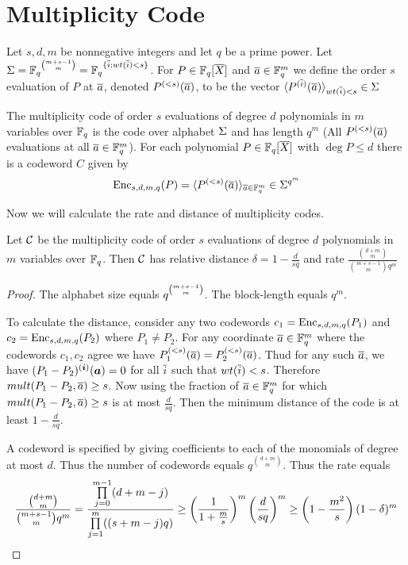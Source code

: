\section{Multiplicity Code}
\begin{definition}
	Let $s,d,m$ be nonnegative integers and let $q$ be a prime power. Let $\Sigma=\mathbb{F}_q\strut^{{m+s-1}\choose{m}}=\mathbb{F}_q\strut^{\{\overline{i}:wt(\overline{i})<s\}}$. For $P\in \mathbb{F}_q[\overline{X}]$ and $\overline{a}\in \mathbb{F}_q^m$ we define the order $s$ evaluation of $P$ at $\overline{a}$, denoted $P^{(<s)}(\overline{a})$, to be the vector $\langle P^{(\overline{i})}(\overline{a})\rangle_{wt(\overline{i})<s}\in \Sigma$
\end{definition}
\begin{definition}
	The multiplicity code of order $s$ evaluations of degree $d$ polynomials in $m$ variables over $\mathbb{F}_q$ is the code over alphabet $\Sigma$ and has length $q^m$ (All $P^{(<s)}(\overline{a})$ evaluations at all $\overline{a}\in \mathbb{F}_q^m$). For each polynomial $P\in \mathbb{F}_q[\overline{X}]$ with $\deg P\leq d$ there is a codeword $C$ given by $$\operatorname{Enc}_{s,d,m,q}(P)=\langle P^{(<s)}(\overline{a})\rangle_{\overline{a}\in \mathbb{F}_q^m}\in \Sigma^{q^m}$$
\end{definition}
Now we will calculate the rate and distance of multiplicity codes.
\begin{theorem}
	Let $\mathcal{C}$ be the multiplicity code of order $s$ evaluations of degree $d$ polynomials in $m$ variables over $\mathbb{F}_q$. Then $\mathcal{C}$ has relative distance $\delta=1-\frac{d}{sq}$ and rate $\frac{{{d+m}\choose{m}}}{{{m+s-1}\choose{m}}q^m}$
\end{theorem}
\begin{proof}
	The alphabet size equals $q\strut^{{m+s-1}\choose{m}}$. The block-length equals $q^m$.
	
	To calculate the distance, consider any two codewords $c_1=\operatorname{Enc}_{s,d,m,q}(P_1)$ and $c_2=\operatorname{Enc}_{s,d,m,q}(P_2)$ where $P_1\neq P_2$. For any coordinate $\overline{a} \in \mathbb{F}_q^m$ where the codewords $c_1,c_2$ agree we have $P_1^{(<s)}(\overline{a})=P_2^{(<s)}(\overline{a})$. Thud for any such $\overline{a} $, we have $(P_1-P_2)^{(\boldsymbol{i})}(\boldsymbol{a})=0$ for all $\overline{i}$ such that $wt(\overline{i})<s$. Therefore $mult(P_1-P_2,\overline{a})\geq s$. Now using  the fraction of $\overline{a}\in \mathbb{F}_q^m$ for which $mult(P_1-P_2,\overline{a})\geq s$ is at most $\frac{d}{sq}$. Then the minimum distance of the code is at least $1-\frac{d}{sq}$.
	
	A codeword is specified by giving coefficients to each of the monomials of degree at most $d$. Thus the number of codewords equals $q^{{{d+m}\choose{m}}}$. Thus the rate equals $$\frac{{{d+m}\choose{m}}}{{{m+s-1}\choose{m}}q^m}=\frac{\prod\limits_{j=0}^{m-1}(d+m-j)}{\prod\limits_{j=1}^m((s+m-j)q)}\geq \left( \frac{1}{1+\frac{m}{s}} \right)^m\left(\frac{d}{sq}\right)^m\geq \left(1-\frac{m^2}{s}\right)(1-\delta)^m$$
\end{proof}
